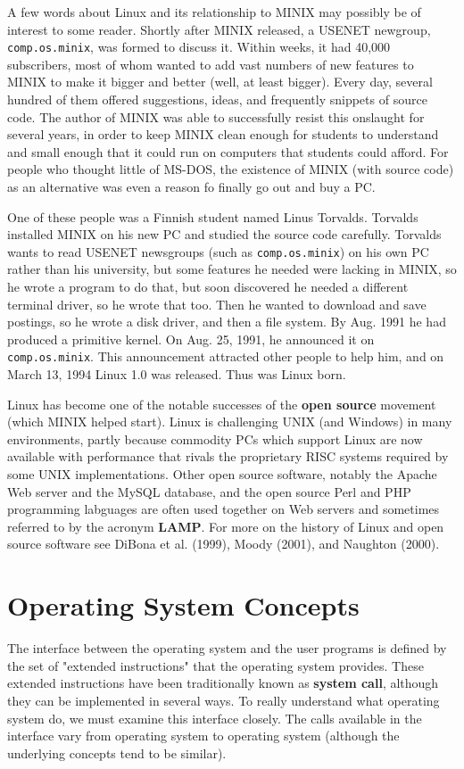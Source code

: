 \documentclass{book}
\newcommand {\kw}  [1] {\textbf{#1}}
\newcommand {\www} [1] {\texttt{#1}}
\begin{document}
A few words about Linux and its relationship to MINIX may possibly be of interest to some reader.
Shortly after MINIX released, a USENET newgroup, \www{comp.os.minix}, was formed to discuss it.
Within weeks, it had 40,000 subscribers, most of whom wanted to add vast numbers of new features to MINIX 
to make it bigger and better (well, at least bigger).
Every day, several hundred of them offered suggestions, ideas, and frequently snippets of source code.
The author of MINIX was able to successfully resist this onslaught for several years, 
in order to keep MINIX clean enough for students to understand and small enough that it could run on computers that students could afford.
For people who thought little of MS-DOS, the existence of MINIX (with source code) as an alternative was even a reason fo finally go out and buy a PC.

One of these people was a Finnish student named Linus Torvalds.
Torvalds installed MINIX on his new PC and studied the source code carefully.
Torvalds wants to read USENET newsgroups (such as \www{comp.os.minix}) on his own PC rather than his university, 
but some features he needed were lacking in MINIX, so he wrote a program to do that, but soon discovered he needed a different terminal driver,
so he wrote that too.
Then he wanted to download and save postings, so he wrote a disk driver, and then a file system.
By Aug. 1991 he had produced a primitive kernel.
On Aug. 25, 1991, he announced it on \www{comp.os.minix}.
This announcement attracted other people to help him, and on March 13, 1994 Linux 1.0 was released.
Thus was Linux born.

Linux has become one of the notable successes of the \kw{open source} movement (which MINIX helped start).
Linux is challenging UNIX (and Windows) in many environments, partly because commodity PCs which support Linux are now available with performance that rivals the proprietary RISC systems required by some UNIX implementations.
Other open source software, notably the Apache Web server and the MySQL database, 
and the open source Perl and PHP programming labguages are often used together on Web servers and sometimes referred to by the acronym \kw{LAMP}.
For more on the history of Linux and open source software see DiBona et al. (1999), Moody (2001), and Naughton (2000).

\section{Operating System Concepts}
The interface between the operating system and the user programs is defined by the set of "extended instructions" that the operating system provides.
These extended instructions have been traditionally known as \kw{system call}, although they can be implemented in several ways.
To really understand what operating system do, we must examine this interface closely.
The calls available in the interface vary from operating system to operating system (although the underlying concepts tend to be similar).
\end{document}
